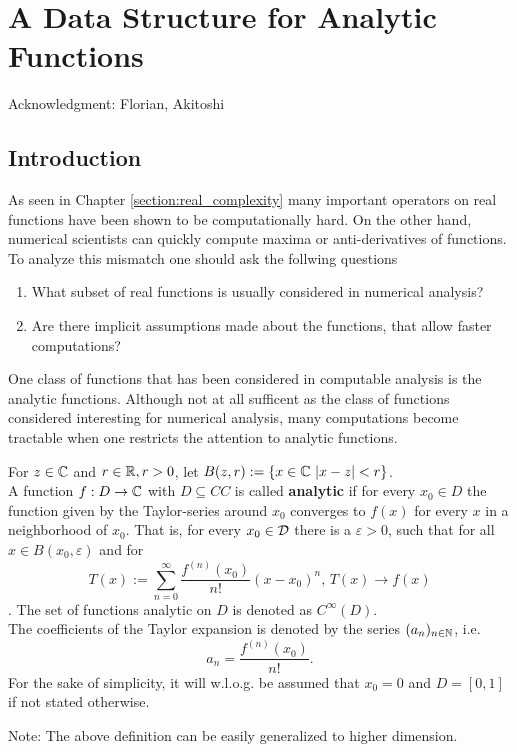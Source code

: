 \section{A Data Structure for Analytic Functions}
	Acknowledgment: Florian, Akitoshi
	\subsection{Introduction}
		As seen in Chapter \ref{section:real_complexity} many important operators 
		on real functions have been shown to be computationally hard.
		On the other hand, numerical scientists can quickly compute maxima or anti-derivatives of functions.
		To analyze this mismatch one should ask the follwing questions
		\begin{enumerate}
			\item What subset of real functions is usually considered in numerical analysis?
			\item Are there implicit assumptions made about the functions, that allow faster computations? 
		\end{enumerate}
		One class of functions that has been considered in computable analysis is the analytic functions.
		Although not at all sufficent as the class of functions considered interesting for numerical analysis, 
		many computations become tractable when one restricts the attention to analytic functions.
		\begin{definition}
			For $z \in \mathbb C$ and $r \in \mathbb R, r > 0$, let $B(z,r) := \{ x \in \mathbb C \,\, | x - z | < r\}$. \\
			A function $f: D \to \mathbb C$ with $D \subseteq CC$ is called \textbf{analytic} if for every $x_0 \in D$ 
			the function given by the Taylor-series around $x_0$ converges to $f(x)$ for every $x$ in a neighborhood of 
			$x_0$. 
			That is, for every $x_0 \in \mathcal D$ there is a $\varepsilon > 0$, such that for all $x \in B(x_0, \varepsilon)$ and for 
			$$ T(x) := \sum_{n=0}^{\infty} \frac{f^{(n)}(x_0)}{n!}(x-x_0)^n  \text{, } T(x) \rightarrow f(x)$$.
			The set of functions analytic on $D$ is denoted as $C^\infty(D)$. \\
			The coefficients of the Taylor expansion is denoted by the series $(a_n)_{n \in \mathbb N}$, i.e. 
			$$ a_n = \frac{f^{(n)}(x_0)}{n!}. $$    
			For the sake of simplicity, it will w.l.o.g. be assumed that $x_0 = 0$  and $D = [0,1]$ if not stated otherwise.
		\end{definition}
		Note: The above definition can be easily generalized to higher dimension. \\
